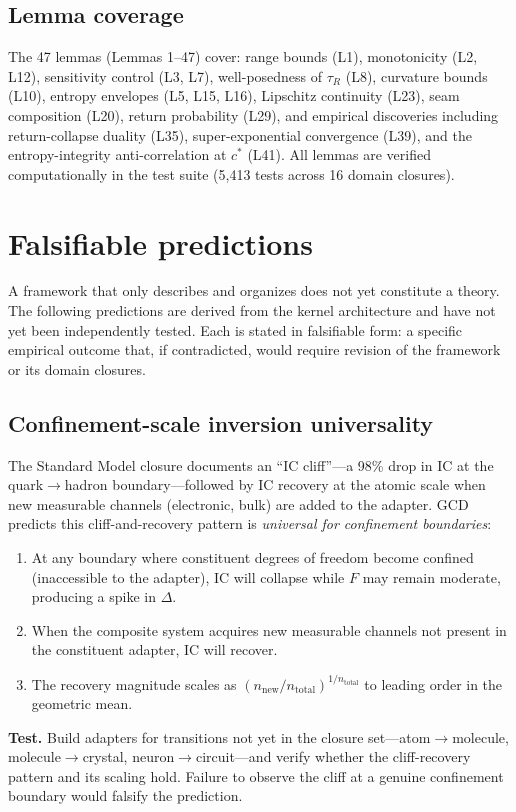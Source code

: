 \documentclass[
  aps,
  prd,
  preprint,
  superscriptaddress,
  nofootinbib,
  floatfix
]{revtex4-2}
\newcommand{\IC}{\mathrm{IC}}
\begin{document}
\subsection{Lemma coverage}
The 47 lemmas (Lemmas 1--47) cover: range bounds (L1), monotonicity (L2, L12), sensitivity control (L3, L7),
well-posedness of $\tau_R$ (L8), curvature bounds (L10), entropy envelopes (L5, L15, L16), Lipschitz continuity (L23),
seam composition (L20), return probability (L29), and empirical discoveries including return-collapse duality (L35),
super-exponential convergence (L39), and the entropy-integrity anti-correlation at $c^*$ (L41).
All lemmas are verified computationally in the test suite (5{,}413 tests across 16 domain closures).

\section{Falsifiable predictions}
\label{sec:predictions}

A framework that only describes and organizes does not yet constitute a theory.
The following predictions are derived from the kernel architecture and have not yet been independently tested.
Each is stated in falsifiable form: a specific empirical outcome that, if contradicted, would require revision
of the framework or its domain closures.

\subsection{Confinement-scale inversion universality}
\label{pred:confinement}

The Standard Model closure documents an ``IC cliff''---a
98\% drop in $\IC$ at the quark$\to$hadron boundary---followed
by $\IC$ recovery at the atomic scale when new measurable
channels (electronic, bulk) are added to the adapter.
GCD predicts this cliff-and-recovery pattern is
\emph{universal for confinement boundaries}:
\begin{enumerate}[leftmargin=2.2em]
  \item At any boundary where constituent degrees of freedom become confined (inaccessible to the adapter),
  $\IC$ will collapse while $F$ may remain moderate, producing a spike in $\Delta$.
  \item When the composite system acquires new measurable channels not present in the constituent adapter,
  $\IC$ will recover.
  \item The recovery magnitude scales as $(n_{\mathrm{new}}/n_{\mathrm{total}})^{1/n_{\mathrm{total}}}$
  to leading order in the geometric mean.
\end{enumerate}
\textbf{Test.} Build adapters for transitions not yet
in the closure set---atom${\to}$molecule,
molecule${\to}$crystal,
neuron${\to}$circuit---and
verify whether the cliff-recovery pattern and
its scaling hold.
Failure to observe the cliff at a genuine confinement
boundary would falsify the prediction.
\end{document}
